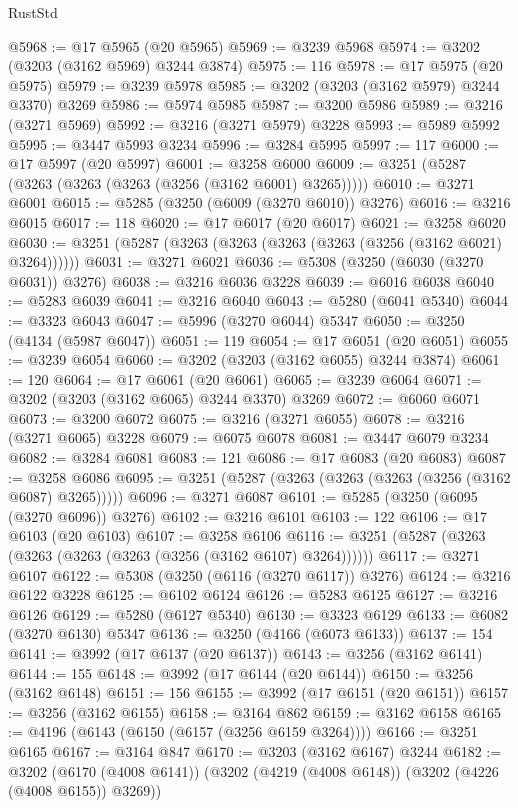 \begin{lexlean}{RustStd}
\begin{coremodule}
@5968 := @17 @5965 (@20 @5965)
@5969 := @3239 @5968
@5974 := @3202 (@3203 (@3162 @5969) @3244 @3874)
@5975 := 116
@5978 := @17 @5975 (@20 @5975)
@5979 := @3239 @5978
@5985 := @3202 (@3203 (@3162 @5979) @3244 @3370) @3269
@5986 := @5974 @5985
@5987 := @3200 @5986
@5989 := @3216 (@3271 @5969)
@5992 := @3216 (@3271 @5979) @3228
@5993 := @5989 @5992
@5995 := @3447 @5993 @3234
@5996 := @3284 @5995
@5997 := 117
@6000 := @17 @5997 (@20 @5997)
@6001 := @3258 @6000
@6009 := @3251 (@5287 (@3263 (@3263 (@3263 (@3256 (@3162 @6001) @3265)))))
@6010 := @3271 @6001
@6015 := @5285 (@3250 (@6009 (@3270 @6010)) @3276)
@6016 := @3216 @6015
@6017 := 118
@6020 := @17 @6017 (@20 @6017)
@6021 := @3258 @6020
@6030 := @3251 (@5287 (@3263 (@3263 (@3263 (@3263 (@3256 (@3162 @6021) @3264))))))
@6031 := @3271 @6021
@6036 := @5308 (@3250 (@6030 (@3270 @6031)) @3276)
@6038 := @3216 @6036 @3228
@6039 := @6016 @6038
@6040 := @5283 @6039
@6041 := @3216 @6040
@6043 := @5280 (@6041 @5340)
@6044 := @3323 @6043
@6047 := @5996 (@3270 @6044) @5347
@6050 := @3250 (@4134 (@5987 @6047))
@6051 := 119
@6054 := @17 @6051 (@20 @6051)
@6055 := @3239 @6054
@6060 := @3202 (@3203 (@3162 @6055) @3244 @3874)
@6061 := 120
@6064 := @17 @6061 (@20 @6061)
@6065 := @3239 @6064
@6071 := @3202 (@3203 (@3162 @6065) @3244 @3370) @3269
@6072 := @6060 @6071
@6073 := @3200 @6072
@6075 := @3216 (@3271 @6055)
@6078 := @3216 (@3271 @6065) @3228
@6079 := @6075 @6078
@6081 := @3447 @6079 @3234
@6082 := @3284 @6081
@6083 := 121
@6086 := @17 @6083 (@20 @6083)
@6087 := @3258 @6086
@6095 := @3251 (@5287 (@3263 (@3263 (@3263 (@3256 (@3162 @6087) @3265)))))
@6096 := @3271 @6087
@6101 := @5285 (@3250 (@6095 (@3270 @6096)) @3276)
@6102 := @3216 @6101
@6103 := 122
@6106 := @17 @6103 (@20 @6103)
@6107 := @3258 @6106
@6116 := @3251 (@5287 (@3263 (@3263 (@3263 (@3263 (@3256 (@3162 @6107) @3264))))))
@6117 := @3271 @6107
@6122 := @5308 (@3250 (@6116 (@3270 @6117)) @3276)
@6124 := @3216 @6122 @3228
@6125 := @6102 @6124
@6126 := @5283 @6125
@6127 := @3216 @6126
@6129 := @5280 (@6127 @5340)
@6130 := @3323 @6129
@6133 := @6082 (@3270 @6130) @5347
@6136 := @3250 (@4166 (@6073 @6133))
@6137 := 154
@6141 := @3992 (@17 @6137 (@20 @6137))
@6143 := @3256 (@3162 @6141)
@6144 := 155
@6148 := @3992 (@17 @6144 (@20 @6144))
@6150 := @3256 (@3162 @6148)
@6151 := 156
@6155 := @3992 (@17 @6151 (@20 @6151))
@6157 := @3256 (@3162 @6155)
@6158 := @3164 @862
@6159 := @3162 @6158
@6165 := @4196 (@6143 (@6150 (@6157 (@3256 @6159 @3264))))
@6166 := @3251 @6165
@6167 := @3164 @847
@6170 := @3203 (@3162 @6167) @3244
@6182 := @3202
    (@6170 (@4008 @6141))
    (@3202 (@4219 (@4008 @6148)) (@3202 (@4226 (@4008 @6155)) @3269))

\end{coremodule}
\end{lexlean}

